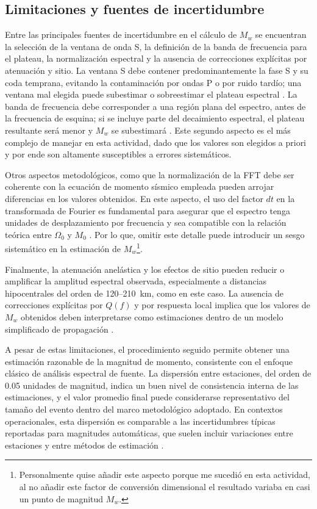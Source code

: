 \documentclass[a4paper,12pt]{article} %
\numberwithin{equation}{section} %
\numberwithin{figure}{section} %
\begin{document}
\subsection{Limitaciones y fuentes de incertidumbre}

Entre las principales fuentes de incertidumbre en el cálculo de $M_w$ se encuentran la selección de la ventana de onda S, la definición de la banda de frecuencia para el plateau, la normalización espectral y la ausencia de correcciones explícitas por atenuación y sitio. La ventana S debe contener predominantemente la fase S y su coda temprana, evitando la contaminación por ondas P o por ruido tardío; una ventana mal elegida puede subestimar o sobreestimar el plateau espectral \cite{aki1980quantitative}. La banda de frecuencia debe corresponder a una región plana del espectro, antes de la frecuencia de esquina; si se incluye parte del decaimiento espectral, el plateau resultante será menor y $M_w$ se subestimará \cite{bormann2014new}. Este segundo aspecto es el más complejo de manejar en esta actividad, dado que los valores son elegidos a priori y por ende son altamente susceptibles a errores sistemáticos.

Otros aspectos metodológicos, como que la normalización de la FFT debe ser coherente con la ecuación de momento sísmico empleada pueden arrojar diferencias en los valores obtenidos. En este aspecto, el uso del factor $dt$ en la transformada de Fourier es fundamental para asegurar que el espectro tenga unidades de desplazamiento por frecuencia y sea compatible con la relación teórica entre $\Omega_0$ y $M_0$ \cite{aki1980quantitative}. Por lo que, omitir este detalle puede introducir un sesgo sistemático en la estimación de $M_w$\footnote{Personalmente quise añadir este aspecto porque me sucedió en esta actividad, al no añadir este factor de conversión dimensional el resultado variaba en casi un punto de magnitud $M_w$.}.

Finalmente, la atenuación anelástica y los efectos de sitio pueden reducir o amplificar la amplitud espectral observada, especialmente a distancias hipocentrales del orden de 120--210~km, como en este caso. La ausencia de correcciones explícitas por $Q(f)$ y por respuesta local implica que los valores de $M_w$ obtenidos deben interpretarse como estimaciones dentro de un modelo simplificado de propagación \cite{bormann2014new}.

A pesar de estas limitaciones, el procedimiento seguido permite obtener una estimación razonable de la magnitud de momento, consistente con el enfoque clásico de análisis espectral de fuente. La dispersión entre estaciones, del orden de 0.05 unidades de magnitud, indica un buen nivel de consistencia interna de las estimaciones, y el valor promedio final puede considerarse representativo del tamaño del evento dentro del marco metodológico adoptado. En contextos operacionales, esta dispersión es comparable a las incertidumbres típicas reportadas para magnitudes automáticas, que suelen incluir variaciones entre estaciones y entre métodos de estimación \cite{gempa2026global}.
\end{document}
